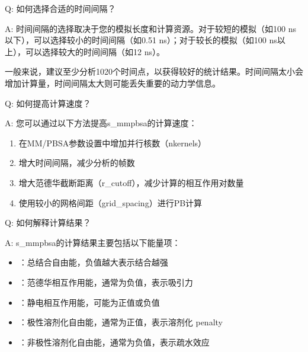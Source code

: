\documentclass[letterpaper,10pt,english]{sphinxmanual}
\begin{document}
\sphinxAtStartPar
Q: 如何选择合适的时间间隔？

\sphinxAtStartPar
A: 时间间隔的选择取决于您的模拟长度和计算资源。对于较短的模拟（如100 ns以下），可以选择较小的时间间隔（如0.5\sphinxhyphen{}1 ns）；对于较长的模拟（如100 ns以上），可以选择较大的时间间隔（如1\sphinxhyphen{}2 ns）。

\sphinxAtStartPar
一般来说，建议至少分析10\sphinxhyphen{}20个时间点，以获得较好的统计结果。时间间隔太小会增加计算量，时间间隔太大则可能丢失重要的动力学信息。

\sphinxAtStartPar
Q: 如何提高计算速度？

\sphinxAtStartPar
A: 您可以通过以下方法提高s\_mmpbsa的计算速度：
\begin{enumerate}
%
\item {} 
\sphinxAtStartPar
在MM/PB\sphinxhyphen{}SA参数设置中增加并行核数（nkernels）

\item {} 
\sphinxAtStartPar
增大时间间隔，减少分析的帧数

\item {} 
\sphinxAtStartPar
增大范德华截断距离（r\_cutoff），减少计算的相互作用对数量

\item {} 
\sphinxAtStartPar
使用较小的网格间距（grid\_spacing）进行PB计算

\end{enumerate}

\sphinxAtStartPar
Q: 如何解释计算结果？

\sphinxAtStartPar
A: s\_mmpbsa的计算结果主要包括以下能量项：
\begin{itemize}
\item {} 
\sphinxAtStartPar
{}：总结合自由能，负值越大表示结合越强

\item {} 
\sphinxAtStartPar
{}：范德华相互作用能，通常为负值，表示吸引力

\item {} 
\sphinxAtStartPar
{}：静电相互作用能，可能为正值或负值

\item {} 
\sphinxAtStartPar
{}：极性溶剂化自由能，通常为正值，表示溶剂化 penalty

\item {} 
\sphinxAtStartPar
{}：非极性溶剂化自由能，通常为负值，表示疏水效应

\end{itemize}
\end{document}
